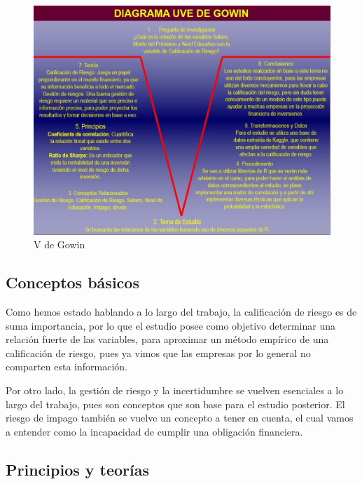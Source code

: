 \documentclass[
  letterpaper,
  DIV=11,
  numbers=noendperiod]{scrreprt}
\begin{document}
\begin{figure}[H]

{\centering \includegraphics{imagenes/v-gowin.jpeg}

}

\caption{V de Gowin}

\end{figure}%

\subsection{Conceptos básicos}\label{conceptos-buxe1sicos}

Como hemos estado hablando a lo largo del trabajo, la calificación de
riesgo es de suma importancia, por lo que el estudio posee como objetivo
determinar una relación fuerte de las variables, para aproximar un
método empírico de una calificación de riesgo, pues ya vimos que las
empresas por lo general no comparten esta información.

Por otro lado, la gestión de riesgo y la incertidumbre se vuelven
esenciales a lo largo del trabajo, pues son conceptos que son base para
el estudio posterior. El riesgo de impago también se vuelve un concepto
a tener en cuenta, el cual vamos a entender como la incapacidad de
cumplir una obligación financiera.

\subsection{Principios y teorías}\label{principios-y-teoruxedas}
\end{document}

